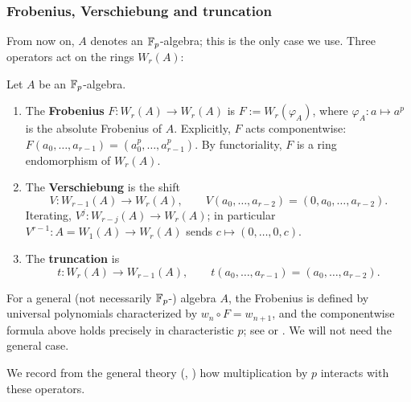 \subsubsection*{Frobenius, Verschiebung and truncation}

From now on, $A$ denotes an $\mathbb{F}_p$-algebra; this is the only case we use. Three
operators act on the rings $W_r(A)$:

\begin{definition}\label{definition:witt_operators:reorg}
Let $A$ be an $\mathbb{F}_p$-algebra.
\begin{enumerate}
    \item The \textbf{Frobenius} $F \colon W_r(A) \to W_r(A)$ is
    $F := W_r(\varphi_A)$, where $\varphi_A \colon a \mapsto a^p$ is the absolute
    Frobenius of $A$. Explicitly, $F$ acts componentwise:
    $F(a_0, \dots, a_{r-1}) = (a_0^p, \dots, a_{r-1}^p)$. By functoriality, $F$ is a
    ring endomorphism of $W_r(A)$.
    \item The \textbf{Verschiebung} is the shift
    \[
    V \colon W_{r-1}(A) \to W_r(A),
    \qquad
    V(a_0, \dots, a_{r-2}) = (0, a_0, \dots, a_{r-2}).
    \]
    Iterating, $V^j \colon W_{r-j}(A) \to W_r(A)$; in particular
    $V^{r-1} \colon A = W_1(A) \to W_r(A)$ sends $c \mapsto (0, \dots, 0, c)$.
    \item The \textbf{truncation} is
    \[
    t \colon W_r(A) \to W_{r-1}(A),
    \qquad
    t(a_0, \dots, a_{r-1}) = (a_0, \dots, a_{r-2}).
    \]
\end{enumerate}
\end{definition}

\begin{rem*}
For a general (not necessarily $\mathbb{F}_p$-) algebra $A$, the Frobenius is defined by
universal polynomials characterized by $w_n \circ F = w_{n+1}$, and the componentwise
formula above holds precisely in characteristic $p$; see
\cite[II, \S6]{serreLF} or \cite[\S2]{Rabinoff2014Witt}. We will not need the general
case.
\end{rem*}

We record from the general theory (\cite[II, \S6]{serreLF},
\cite[\S2]{Rabinoff2014Witt}) how multiplication by $p$ interacts with these
operators.

